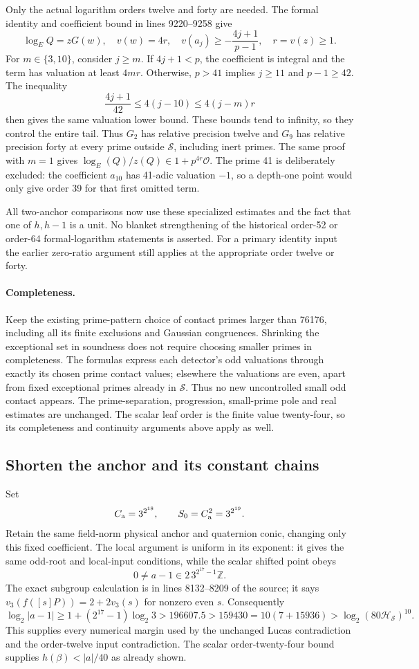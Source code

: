 Only the actual logarithm orders twelve and forty are needed. The
formal identity and coefficient bound in lines 9220--9258 give
\[
 \log_E Q=zG(w),\quad v(w)=4r,\quad
 v(a_j)\ge-\frac{4j+1}{p-1},\quad r=v(z)\ge1.
\]
For $m\in\{3,10\}$, consider $j\ge m$. If $4j+1<p$, the coefficient
is integral and the term has valuation at least $4mr$. Otherwise,
$p>41$ implies $j\ge11$ and $p-1\ge42$. The inequality
\[
 \frac{4j+1}{42}\le4(j-10)\le4(j-m)r
\]
then gives the same valuation lower bound. These bounds tend to infinity,
so they control the entire tail. Thus $G_2$ has relative precision twelve
and $G_9$ has relative precision forty at every prime outside
$\mathcal S$, including inert primes. The same proof with $m=1$
gives $\log_E(Q)/z(Q)\in1+p^{4r}\mathcal O$.
The prime 41 is deliberately excluded: the coefficient $a_{10}$ has
41-adic valuation $-1$, so a depth-one point would only give order 39
for that first omitted term.

All two-anchor comparisons now use these specialized estimates and
the fact that one of $h,h-1$ is a unit. No blanket strengthening of the
historical order-52 or order-64 formal-logarithm statements is asserted.
For a primary identity input the earlier zero-ratio argument still
applies at the appropriate order twelve or forty.

\paragraph{Completeness.}
Keep the existing prime-pattern choice of contact primes larger than
76176, including all its finite exclusions and Gaussian congruences.
Shrinking the exceptional set in soundness does not require choosing
smaller primes in completeness. The formulas express each detector's
odd valuations through exactly its chosen prime contact values; elsewhere
the valuations are even, apart from fixed exceptional primes already in
$\mathcal S$. Thus no new uncontrolled small odd contact appears.
The prime-separation, progression, small-prime pole and real estimates
are unchanged. The scalar leaf order is the finite value twenty-four,
so its completeness and continuity arguments above apply as well.

\subsection{Shorten the anchor and its constant chains}

Set
\[
 C_{\rm a}=3^{2^{18}},\qquad S_0=C_{\rm a}^2=3^{2^{19}}.
\]
Retain the same field-norm physical anchor and quaternion conic, changing
only this fixed coefficient. The local argument is uniform in its
exponent: it gives the same odd-root and local-input conditions, while
the scalar shifted point obeys
\[
 0\ne a-1\in2\,3^{2^{17}-1}\mathbb Z.
\]
The exact subgroup calculation is in lines 8132--8209 of the source;
it says $v_3(f([s]P))=2+2v_3(s)$ for nonzero even $s$.
Consequently
\[
 \log_2|a-1|\ge1+(2^{17}-1)\log_2 3
 >196607.5>159430
 =10(7+15936)>\log_2(80\mathcal H_{\mathcal S})^{10}.
\]
This supplies every numerical margin used by the unchanged Lucas
contradiction and the order-twelve input contradiction. The scalar
order-twenty-four bound supplies $h(\beta)<|a|/40$ as already shown.

